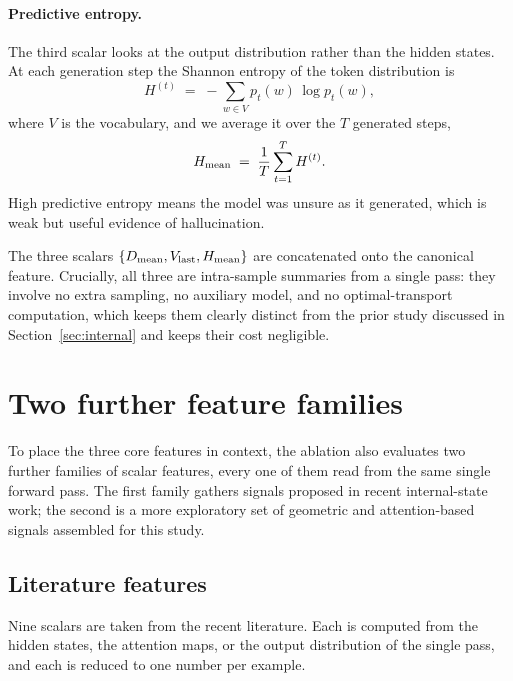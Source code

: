 \paragraph{Predictive entropy.}
The third scalar looks at the output distribution rather than the hidden states. At each
generation step the Shannon entropy of the token distribution is
\begin{equation}
H^{(t)} \;=\; -\sum_{w \in V} p_t(w)\,\log p_t(w),
\end{equation}
where $V$ is the vocabulary, and we average it over the $T$ generated steps,
\begin{equation}
H_{\mathrm{mean}} \;=\; \frac{1}{T}\sum_{t=1}^{T} H^{(t)} .
\end{equation}
High predictive entropy means the model was unsure as it generated, which is weak but
useful evidence of hallucination.

The three scalars $\{D_{\mathrm{mean}},V_{\mathrm{last}},H_{\mathrm{mean}}\}$ are concatenated onto the canonical feature.
Crucially, all three are intra-sample summaries from a single pass: they involve no extra
sampling, no auxiliary model, and no optimal-transport computation, which keeps them
clearly distinct from the prior study discussed in Section~\ref{sec:internal} and keeps
their cost negligible.

\section{Two further feature families}
\label{sec:wider}

To place the three core features in context, the ablation also evaluates two further
families of scalar features, every one of them read from the same single forward pass. The
first family gathers signals proposed in recent internal-state work; the second is a more
exploratory set of geometric and attention-based signals assembled for this study.

\subsection{Literature features}
\label{sec:litfeat}

Nine scalars are taken from the recent literature. Each is computed from the hidden states,
the attention maps, or the output distribution of the single pass, and each is reduced to
one number per example.

